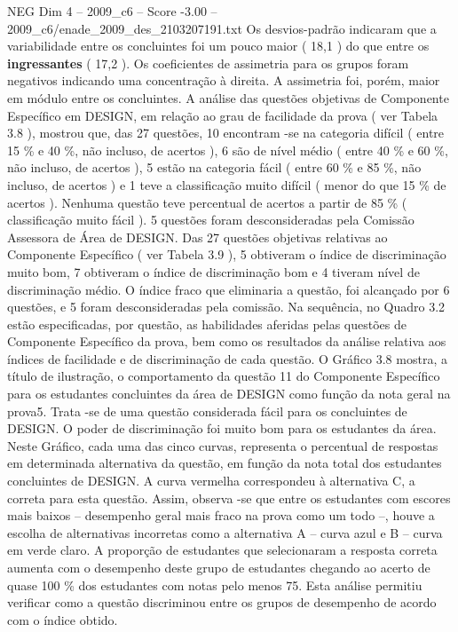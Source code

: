 \begin{textsample}{NEG Dim 4 – 2009\_c6 – Score -3.00 – 2009\_c6/enade\_2009\_des\_2103207191.txt}
Os desvios-padrão indicaram que a variabilidade entre os concluintes foi um pouco maior ( 18,1 ) do que entre os \textbf{ingressantes} ( 17,2 ).
Os coeficientes de assimetria para os grupos foram negativos indicando uma concentração à direita.
A assimetria foi, porém, maior em módulo entre os concluintes.
A análise das questões objetivas de Componente Específico em DESIGN, em relação ao grau de facilidade da prova ( ver Tabela 3.8 ), mostrou que, das 27 questões, 10 encontram -se na categoria difícil ( entre 15 \% e 40 \%, não incluso, de acertos ), 6 são de nível médio ( entre 40 \% e 60 \%, não incluso, de acertos ), 5 estão na categoria fácil ( entre 60 \% e 85 \%, não incluso, de acertos ) e 1 teve a classificação muito difícil ( menor do que 15 \% de acertos ).
Nenhuma questão teve percentual de acertos a partir de 85 \% ( classificação muito fácil ). 5 questões foram desconsideradas pela Comissão Assessora de Área de DESIGN.
Das 27 questões objetivas relativas ao Componente Específico ( ver Tabela 3.9 ), 5 obtiveram o índice de discriminação muito bom, 7 obtiveram o índice de discriminação bom e 4 tiveram nível de discriminação médio.
O índice fraco que eliminaria a questão, foi alcançado por 6 questões, e 5 foram desconsideradas pela comissão.
Na sequência, no Quadro 3.2 estão especificadas, por questão, as habilidades aferidas pelas questões de Componente Específico da prova, bem como os resultados da análise relativa aos índices de facilidade e de discriminação de cada questão.
O Gráfico 3.8 mostra, a título de ilustração, o comportamento da questão 11 do Componente Específico para os estudantes concluintes da área de DESIGN como função da nota geral na prova5.
Trata -se de uma questão considerada fácil para os concluintes de DESIGN.
O poder de discriminação foi muito bom para os estudantes da área.
Neste Gráfico, cada uma das cinco curvas, representa o percentual de respostas em determinada alternativa da questão, em função da nota total dos estudantes concluintes de DESIGN.
A curva vermelha correspondeu à alternativa C, a correta para esta questão.
Assim, observa -se que entre os estudantes com escores mais baixos – desempenho geral mais fraco na prova como um todo –, houve a escolha de alternativas incorretas como a alternativa A – curva azul e B – curva em verde claro.
A proporção de estudantes que selecionaram a resposta correta aumenta com o desempenho deste grupo de estudantes chegando ao acerto de quase 100 \% dos estudantes com notas pelo menos 75.
Esta análise permitiu verificar como a questão discriminou entre os grupos de desempenho de acordo com o índice obtido.

\end{textsample}
